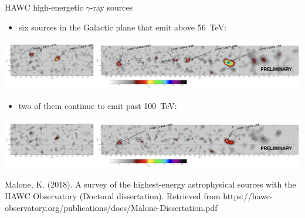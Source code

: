\begin{frame}{HAWC high-energetic $\gamma$-ray sources}

\begin{itemize}
  \item six sources in the Galactic plane that emit above 56~TeV:
\end{itemize}
\includegraphics[width=1\textwidth]{pics/HWC_above_56TeV.png}
\begin{itemize}
  \item two of them continue to emit past 100~TeV:
\end{itemize}
\includegraphics[width=1\textwidth]{pics/HWC_above_100TeV.png}

Malone, K. (2018). A survey of the highest-energy astrophysical sources with the HAWC Observatory (Doctoral dissertation).
Retrieved from https://hawc-observatory.org/publications/docs/Malone-Dissertation.pdf

\end{frame}

